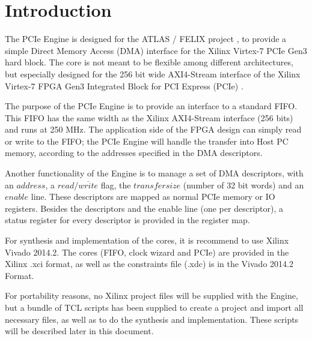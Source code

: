 \section{Introduction}
The PCIe Engine is designed for the ATLAS / FELIX project \cite{atlas}, to provide a simple
Direct Memory Access (DMA) interface for the Xilinx  Virtex-7 PCIe Gen3 hard block. The core is not meant to be flexible among different architectures, but especially designed for the 256 bit wide AXI4-Stream interface
\cite{ug761}  of the Xilinx Virtex-7 FPGA Gen3 Integrated Block for PCI Express (PCIe) \cite{xilinxcore}
\cite{pg023}.

The purpose of the PCIe Engine is to provide an interface to a standard FIFO. This FIFO has the same width as the Xilinx AXI4-Stream interface (256 bits) and runs at 250 MHz. The application side of the FPGA design can simply read or write to the FIFO; the PCIe Engine will handle the transfer into Host PC memory, according to the addresses specified in the DMA descriptors.

Another functionality of the Engine is to manage a set of DMA descriptors, with an $address$, a $read/\overline{write}$ flag, the $transfer size$ (number of 32 bit words) and an $enable$ line. These descriptors are mapped as normal PCIe memory or IO registers. Besides the descriptors and the enable line (one per descriptor), a status register for every descriptor is provided in the register map.

For synthesis and implementation of the cores, it is recommend to use Xilinx Vivado 2014.2. The cores (FIFO, clock wizard and PCIe) are provided in the Xilinx .xci format, as well as the constraints file (.xdc) is in the Vivado 2014.2 Format.

For portability reasons, no Xilinx project files will be supplied with the Engine, but a bundle of TCL scripts has been supplied to create a project and import all necessary files, as well as to do the synthesis and implementation. These scripts will be described later in this document.


\newpage